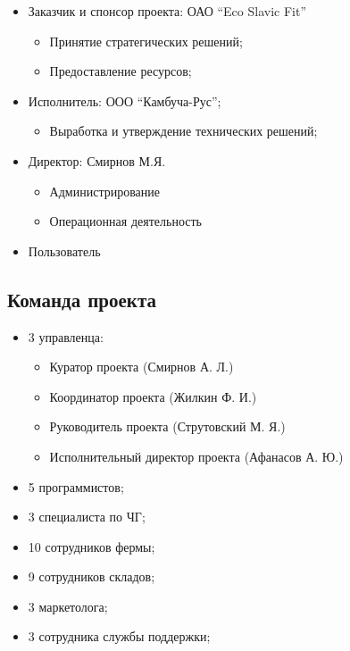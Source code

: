 \documentclass[a4paper,10pt]{article}
\begin{document}
    \begin{itemize}
        \item Заказчик и спонсор проекта: ОАО ``Eco Slavic Fit''
            \begin{itemize}
                \item Принятие стратегических решений;
                \item Предоставление ресурсов;
            \end{itemize}
        \item Исполнитель: ООО ``Камбуча-Рус'';
            \begin{itemize}
                \item Выработка и утверждение технических решений;
            \end{itemize}
        \item Директор: Смирнов М.Я.
            \begin{itemize}
                \item Администрирование
                \item Операционная деятельность
            \end{itemize}
        \item Пользователь
    \end{itemize}

\subsection{Команда проекта}

    \begin{itemize}
        \item 3 управленца:
            \begin{itemize}
                \item Куратор проекта (Смирнов А. Л.)
                \item Координатор проекта (Жилкин Ф. И.)
                \item Руководитель проекта (Струтовский М. Я.)
                \item Исполнительный директор проекта (Афанасов А. Ю.)
            \end{itemize}
        \item 5 программистов;
        \item 3 специалиста по ЧГ;
        \item 10 сотрудников фермы;
        \item 9 сотрудников складов;
        \item 3 маркетолога;
        \item 3 сотрудника службы поддержки;
    \end{itemize}
\end{document}
